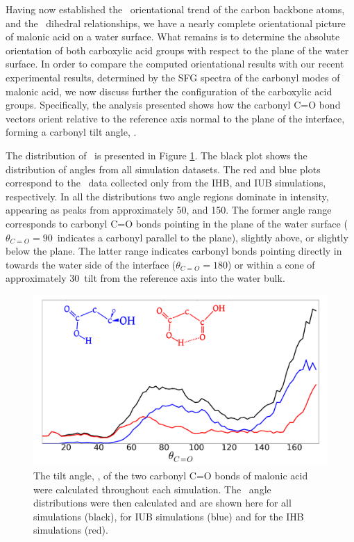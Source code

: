 Having now established the \thetaphi~orientational trend of the carbon backbone atoms, and the \psipsi~dihedral relationships, we have a nearly complete orientational picture of malonic acid on a water surface. What remains is to determine the absolute orientation of both carboxylic acid groups with respect to the plane of the water surface. In order to compare the computed orientational results with our recent experimental results,\cite{Blower2012} determined by the SFG spectra of the carbonyl modes of malonic acid, we now discuss further the configuration of the carboxylic acid groups. Specifically, the analysis presented shows how the carbonyl C=O bond vectors orient relative to the reference axis normal to the plane of the interface, forming a carbonyl tilt angle, \thetacarb.

The distribution of \thetacarb~is presented in Figure \ref{fig:theta-carb}. The black plot shows the distribution of angles from all simulation datasets. The red and blue plots correspond to the \thetacarb~data collected only from the IHB, and IUB simulations, respectively. In all the distributions two angle regions dominate in intensity, appearing as peaks from approximately 50\degr, and 150\degr. The former angle range corresponds to carbonyl C=O bonds pointing in the plane of the water surface ($\theta_{C=O}=90$\degr~indicates a carbonyl parallel to the plane), slightly above, or slightly below the plane. The latter range indicates carbonyl bonds pointing directly in towards the water side of the interface ($\theta_{C=O}=180$\degr) or within a cone of approximately 30\degr~tilt from the reference axis into the water bulk.

\begin{figure}[h!]
	\begin{center}
		\includegraphics[scale=1.0]{images/orientation/ThetaCarbonyl.png}
		\caption{The tilt angle, \thetacarb, of the two carbonyl C=O bonds of malonic acid were calculated throughout each simulation. The \thetacarb~angle distributions were then calculated and are shown here for all simulations (black), for IUB simulations (blue) and for the IHB simulations (red).}
		\label{fig:theta-carb}
	\end{center}
\end{figure}

